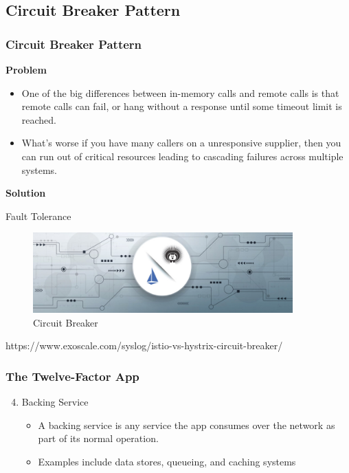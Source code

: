 \documentclass{beamer}
\begin{document}
	\subsection {Circuit Breaker Pattern}
		\begin{frame}
			\frametitle{Circuit Breaker Pattern}
			\textbf {Problem} \par
			\begin{itemize}
				\item<1-> \scriptsize {One of the big differences between in-memory calls and remote calls is that remote calls can fail, or hang without a response until some timeout limit is reached}.
				\item<2-> \scriptsize {What's worse if you have many callers on a unresponsive supplier, then you can run out of critical resources leading to cascading failures across multiple systems}.
			\end{itemize}  
			\textbf {Solution} \par
			\hspace{3mm} \small {Fault Tolerance}
			\begin{figure}[h]
				\includegraphics[width=100mm,scale=1]{img/cbp.png}
				\caption{Circuit Breaker}
			\end{figure}\vspace{20mm}
		
			\tiny{https://www.exoscale.com/syslog/istio-vs-hystrix-circuit-breaker/}	
		\end{frame}
	
	
		\begin{frame}
			\frametitle{The Twelve-Factor App}
				\begin{enumerate}
					\setcounter{enumi}{3}
					\item Backing Service \\
						\begin{itemize}
							\item A backing service is any service the app consumes over the network as part of its normal operation. 
							\item Examples include data stores, queueing, and caching systems
						\end{itemize}
						\vspace{2mm}
				\end{enumerate}
			\vspace{100mm}
		\end{frame}
	
\end{document}
